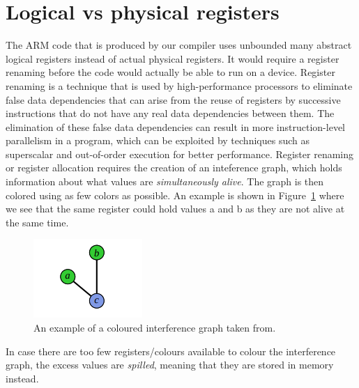 \section{Logical vs physical registers}
The ARM code that is produced by our compiler uses unbounded many abstract logical registers instead of actual physical registers.
It would require a register renaming before the code would actually be able to run on a device.
Register renaming is a technique that is used by high-performance processors to eliminate false data dependencies that can arise from the reuse of registers by successive instructions that do not have any real data dependencies between them.
The elimination of these false data dependencies can result in more instruction-level parallelism in a program, which can be exploited by techniques such as superscalar and out-of-order execution for better performance.
Register renaming or register allocation requires the creation of an inteference graph, which holds information about what values are \emph{simultaneously alive}. The graph is then colored using as few colors as possible. An example is shown in Figure~\ref{fig:interferencegraph} where we see that the same register could hold values a and b as they are not alive at the same time.

\begin{figure}[tp]
  \centering
  \includegraphics[scale=0.5]{Graphics/interferencegraph.png}
  \caption{An example of a coloured interference graph taken from\cite{ITU_liveness}.}
  \label{fig:interferencegraph}
\end{figure}

In case there are too few registers/colours available to colour the interference graph, the excess values are \emph{spilled}, meaning that they are stored in memory instead.
